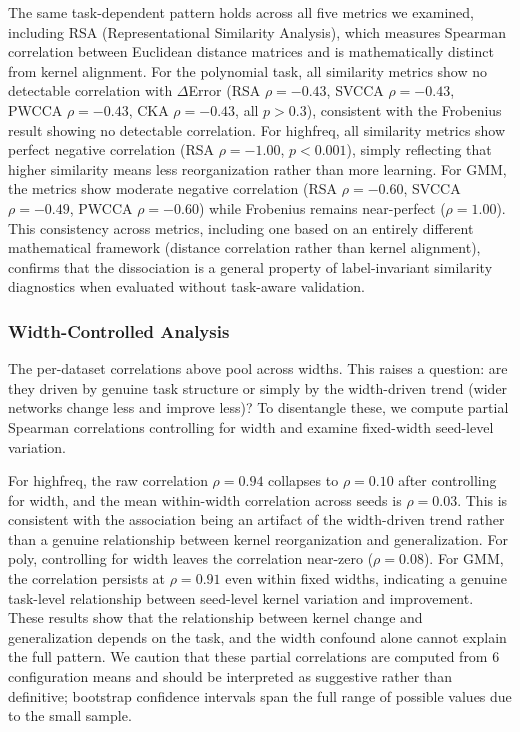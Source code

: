 \documentclass[10pt]{article}
\begin{document}
The same task-dependent pattern holds across all five metrics we examined, including RSA (Representational Similarity Analysis), which measures Spearman correlation between Euclidean distance matrices and is mathematically distinct from kernel alignment. For the polynomial task, all similarity metrics show no detectable correlation with $\Delta$Error (RSA $\rho=-0.43$, SVCCA $\rho=-0.43$, PWCCA $\rho=-0.43$, CKA $\rho=-0.43$, all $p>0.3$), consistent with the Frobenius result showing no detectable correlation. For highfreq, all similarity metrics show perfect negative correlation (RSA $\rho=-1.00$, $p<0.001$), simply reflecting that higher similarity means less reorganization rather than more learning. For GMM, the metrics show moderate negative correlation (RSA $\rho=-0.60$, SVCCA $\rho=-0.49$, PWCCA $\rho=-0.60$) while Frobenius remains near-perfect ($\rho=1.00$). This consistency across metrics, including one based on an entirely different mathematical framework (distance correlation rather than kernel alignment), confirms that the dissociation is a general property of label-invariant similarity diagnostics when evaluated without task-aware validation.

\subsubsection{Width-Controlled Analysis}

The per-dataset correlations above pool across widths. This raises a question: are they driven by genuine task structure or simply by the width-driven trend (wider networks change less and improve less)? To disentangle these, we compute partial Spearman correlations controlling for width and examine fixed-width seed-level variation.

For highfreq, the raw correlation $\rho=0.94$ collapses to $\rho=0.10$ after controlling for width, and the mean within-width correlation across seeds is $\rho=0.03$. This is consistent with the association being an artifact of the width-driven trend rather than a genuine relationship between kernel reorganization and generalization. For poly, controlling for width leaves the correlation near-zero ($\rho=0.08$). For GMM, the correlation persists at $\rho=0.91$ even within fixed widths, indicating a genuine task-level relationship between seed-level kernel variation and improvement. These results show that the relationship between kernel change and generalization depends on the task, and the width confound alone cannot explain the full pattern. We caution that these partial correlations are computed from 6 configuration means and should be interpreted as suggestive rather than definitive; bootstrap confidence intervals span the full range of possible values due to the small sample.
\end{document}
